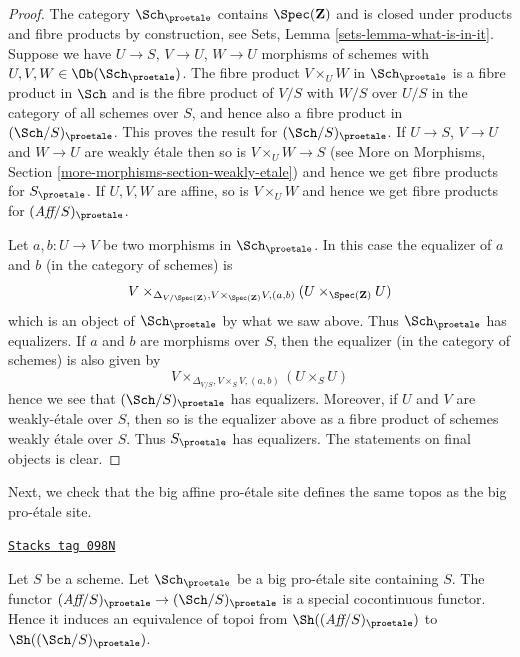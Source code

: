 \begin{proof}
The category $\Sch_\proetale$ contains $\Spec(\mathbf{Z})$ and
is closed under products and fibre products by construction, see
Sets, Lemma \ref{sets-lemma-what-is-in-it}.
Suppose we have $U \to S$, $V \to U$, $W \to U$ morphisms
of schemes with $U, V, W \in \Ob(\Sch_\proetale)$.
The fibre product $V \times_U W$ in $\Sch_\proetale$
is a fibre product in $\Sch$ and
is the fibre product of $V/S$ with $W/S$ over $U/S$ in
the category of all schemes over $S$, and hence also a
fibre product in $(\Sch/S)_\proetale$.
This proves the result for $(\Sch/S)_\proetale$.
If $U \to S$, $V \to U$ and $W \to U$ are weakly \'etale then so is
$V \times_U W \to S$ (see
More on Morphisms, Section \ref{more-morphisms-section-weakly-etale})
and hence we get fibre products for $S_\proetale$.
If $U, V, W$ are affine, so is $V \times_U W$ and hence we
get fibre products for $(\textit{Aff}/S)_\proetale$.

\medskip\noindent
Let $a, b : U \to V$ be two morphisms in $\Sch_\proetale$.
In this case the equalizer of $a$ and $b$ (in the category of schemes) is
$$
V
\times_{\Delta_{V/\Spec(\mathbf{Z})}, V \times_{\Spec(\mathbf{Z})} V, (a, b)}
(U \times_{\Spec(\mathbf{Z})} U)
$$
which is an object of $\Sch_\proetale$ by what we saw above.
Thus $\Sch_\proetale$ has equalizers. If $a$ and $b$ are morphisms over $S$,
then the equalizer (in the category of schemes) is also given by
$$
V \times_{\Delta_{V/S}, V \times_S V, (a, b)} (U \times_S U)
$$
hence we see that $(\Sch/S)_\proetale$ has equalizers. Moreover, if
$U$ and $V$ are weakly-\'etale over $S$, then so is the equalizer
above as a fibre product of schemes weakly \'etale over $S$.
Thus $S_\proetale$ has equalizers. The statements on final objects
is clear.
\end{proof}

Next, we check that the big affine pro-\'etale site defines the same
topos as the big pro-\'etale site.

\begin{lemma}
\label{proetale-lemma-affine-big-site-proetale}
\href{https://stacks.math.columbia.edu/tag/098N}{\texttt{Stacks tag 098N}}

Let $S$ be a scheme. Let $\Sch_\proetale$ be a big pro-\'etale
site containing $S$.
The functor $(\textit{Aff}/S)_\proetale \to (\Sch/S)_\proetale$
is a special cocontinuous functor. Hence it induces an equivalence
of topoi from $\Sh((\textit{Aff}/S)_\proetale)$ to
$\Sh((\Sch/S)_\proetale)$.
\end{lemma}

